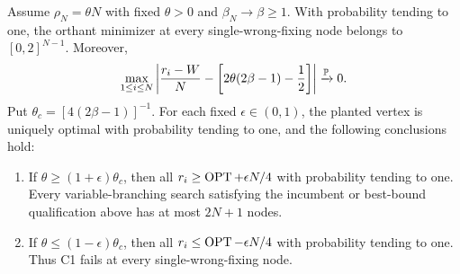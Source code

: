 \begin{theorem}
\label{bls:c1-threshold}
Assume $\rho_N=\theta N$ with fixed $\theta>0$ and
$\beta_N\to\beta\ge1$.  With probability tending to one, the orthant
minimizer at every single-wrong-fixing node belongs to $[0,2]^{N-1}$.
Moreover,
\begin{equation}
 \max_{1\le i\le N}\left|
 \frac{r_i-W}{N}-\left[2\theta(2\beta-1)-\frac12\right]
 \right|\xrightarrow{\mathbb{P}}0.
 \label{bls:uniform-c1-gap}
\end{equation}
Put $\theta_c=[4(2\beta-1)]^{-1}$.  For each fixed
$\epsilon\in(0,1)$, the planted vertex is uniquely optimal with
probability tending to one, and the following conclusions hold:
\begin{enumerate}[label=(\alph*)]
\item If $\theta\ge(1+\epsilon)\theta_c$, then all
$r_i\ge\operatorname{OPT}+\epsilon N/4$ with probability tending to one.  Every
variable-branching search satisfying the incumbent or best-bound
qualification above has at most $2N+1$ nodes.
\item If $\theta\le(1-\epsilon)\theta_c$, then all
$r_i\le\operatorname{OPT}-\epsilon N/4$ with probability tending to one.  Thus C1
fails at every single-wrong-fixing node.
\end{enumerate}
\end{theorem}

